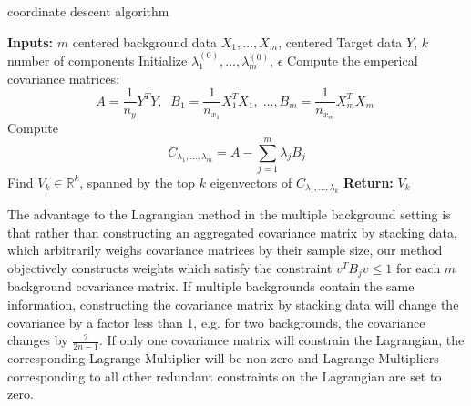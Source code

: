 \documentclass[12pt]{article}
\begin{document}
\begin{algorithm}[ht]
  \caption{coordinate descent algorithm}
  \label{alg:uca-multiple}
  \textbf{Inputs: } $m$ centered background data $X_1,\ldots, X_m $, centered Target data $Y$, $k$ number of components\;
  Initialize $\lambda_{1}^{(0)}, \ldots,\lambda_{m}^{(0)} $, $\epsilon$\;
  Compute the emperical covariance matrices:
  \[A = \frac{1}{n_y}Y^TY,\;\; B_1 = \frac{1}{n_{x_1}}X_1^TX_1,\;\ldots, B_m = \frac{1}{n_{x_m}}X_m^TX_m\; \]
  Compute \[C_{\lambda_1, \ldots, \lambda_m} = A - \sum^{m}_{j = 1}{\lambda_j B_j}\]
  Find $V_k\in \mathbb{R}^k$, spanned by the top $k$ eigenvectors of $C_{\lambda_1, \ldots, \lambda_k}$\;
  \textbf{Return: } $V_k$
\end{algorithm}


The advantage to the Lagrangian method in the multiple background setting is that rather than constructing an aggregated covariance matrix by stacking data, which arbitrarily weighs covariance matrices by their sample size, our method objectively constructs weights which satisfy the constraint $ v^TB_jv\leq 1$ for each $m$ background covariance matrix. If multiple backgrounds contain the same information, constructing the covariance matrix by stacking data will change the covariance by a factor less than 1, e.g. for two backgrounds, the covariance changes by $\frac{2}{2n - 1}$.  If only one covariance matrix will constrain the Lagrangian, the corresponding Lagrange Multiplier will be non-zero and Lagrange Multipliers corresponding to all other redundant constraints on the Lagrangian are set to zero.  
\end{document}
